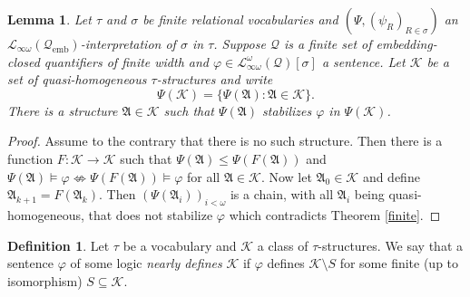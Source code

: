 \documentclass{ndjflart}
\theoremstyle{plain}
\newtheorem{lemma}[conjecture]{Lemma}
\theoremstyle{definition}
\newtheorem{definition}[conjecture]{Definition}
\numberwithin{equation}{section}
\DeclareMathOperator{\emb}{emb}
\begin{document}
\begin{lemma}\label{stabil}
Let $\tau$ and $\sigma$ be finite relational vocabularies and
$(\Psi, (\psi_R)_{R \in \sigma})$ an 
$\mathcal{L}_{\infty \omega}(\mathcal{Q}_{\emb})$-interpretation of $\sigma$ in
$\tau$.
Suppose $\mathcal{Q}$ is a finite set of embedding-closed quantifiers of finite width
and $\varphi \in \mathcal{L}_{\infty\omega}^{\omega}(\mathcal{Q})[\sigma]$ a sentence.
Let $\mathcal{K}$ be a set of quasi-homogeneous $\tau$-structures and write
\[
	\Psi(\mathcal{K}) = \{\Psi(\mathfrak{A}) \colon \mathfrak{A} \in \mathcal{K}\}.
\]
There is a structure $\mathfrak{A} \in \mathcal{K}$ such that $\Psi(\mathfrak{A})$
stabilizes $\varphi$ in $\Psi(\mathcal{K})$.
\end{lemma}
\begin{proof}
Assume to the contrary that there is no such structure.
Then there is a function $F : \mathcal{K} \rightarrow \mathcal{K}$ such that
$\Psi(\mathfrak{A}) \leq \Psi(F(\mathfrak{A}))$ and
$\Psi(\mathfrak{A}) \vDash\varphi \nLeftrightarrow \Psi(F(\mathfrak{A})) \vDash \varphi$ 
for all $\mathfrak{A} \in \mathcal{K}$.
Now let $\mathfrak{A}_0 \in \mathcal{K}$ and define
$\mathfrak{A}_{k+1} = F(\mathfrak{A}_k)$.
Then $(\Psi(\mathfrak{A}_i))_{i<\omega}$ is a chain, with all $\mathfrak{A}_i$
being quasi-homogeneous, that does not stabilize $\varphi$ which contradicts 
Theorem \ref{finite}.
\end{proof}

\begin{definition}
Let $\tau$ be a vocabulary and $\mathcal{K}$ a class of $\tau$-structures.
We say that a sentence $\varphi$ of some logic \emph{nearly defines}
$\mathcal{K}$ if $\varphi$ defines $\mathcal{K} \setminus S$ for some finite
(up to isomorphism) $S \subseteq \mathcal{K}$.
\end{definition}
\end{document}
